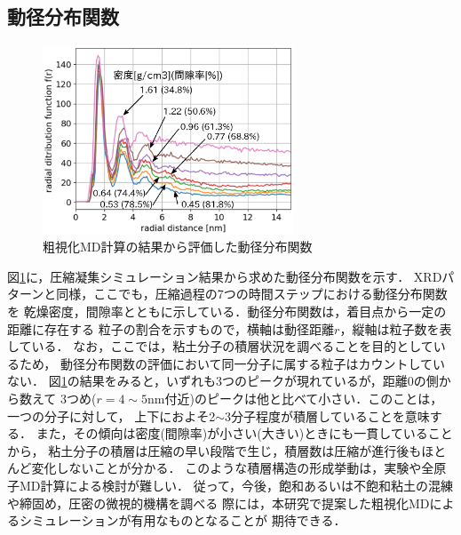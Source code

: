﻿\documentclass[11pt,a4j]{jarticle}
\begin{document}
\subsection{動径分布関数}
\begin{figure}
	\centering
	\includegraphics[keepaspectratio,width=75mm]{Figs/rdfs.eps}
	\vspace{-5mm}
	\caption{粗視化MD計算の結果から評価した動径分布関数}
	\label{fig:fig4}
\end{figure}
図\ref{fig:fig4}に，圧縮凝集シミュレーション結果から求めた動径分布関数を示す．
XRDパターンと同様，ここでも，圧縮過程の7つの時間ステップにおける動径分布関数を
乾燥密度，間隙率とともに示している．動径分布関数は，着目点から一定の距離に存在する
粒子の割合を示すもので，横軸は動径距離$r$，縦軸は粒子数を表している．
なお，ここでは，粘土分子の積層状況を調べることを目的としているため，
動径分布関数の評価において同一分子に属する粒子はカウントしていない．
図\ref{fig:fig4}の結果をみると，いずれも3つのピークが現れているが，距離0の側から数えて
3つめ($r=4\sim 5$nm付近)のピークは他と比べて小さい．このことは，一つの分子に対して，
上下におよそ2$\sim$3分子程度が積層していることを意味する．
また，その傾向は密度(間隙率)が小さい(大きい)ときにも一貫していることから，
粘土分子の積層は圧縮の早い段階で生じ，積層数は圧縮が進行後もほとんど変化しないことが分かる．
このような積層構造の形成挙動は，実験や全原子MD計算による検討が難しい．
従って，今後，飽和あるいは不飽和粘土の混練や締固め，圧密の微視的機構を調べる
際には，本研究で提案した粗視化MDによるシミュレーションが有用なものとなることが
期待できる．
\end{document}
